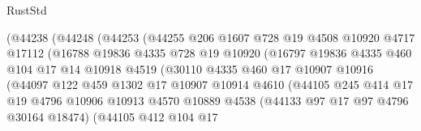 \begin{lexlean}{RustStd}
\begin{coremodule}
                          (@44238
                            (@44248
                              (@44253
                                (@44255
                                  @206
                                  @1607
                                  @728
                                  @19
                                  @4508
                                  @10920
                                  @4717
                                  @17112
                                  (@16788
                                    @19836
                                    @4335
                                    @728
                                    @19
                                    @10920
                                    (@16797
                                      @19836
                                      @4335
                                      @460
                                      @104
                                      @17
                                      @14
                                      @10918
                                      @4519
                                      (@30110
                                        @4335
                                        @460
                                        @17
                                        @10907
                                        @10916
                                        (@44097
                                          @122
                                          @459
                                          @1302
                                          @17
                                          @10907
                                          @10914
                                          @4610
                                          (@44105
                                            @245
                                            @414
                                            @17
                                            @19
                                            @4796
                                            @10906
                                            @10913
                                            @4570
                                            @10889
                                            @4538
                                            (@44133 @97 @17 @97 @4796 @30164 @18474)
                                            (@44105
                                              @412
                                              @104
                                              @17

\end{coremodule}
\end{lexlean}

